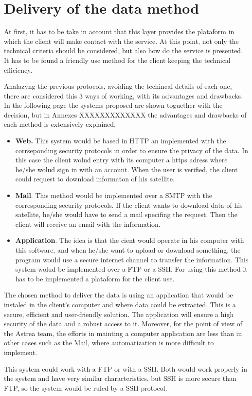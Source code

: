 \section{Delivery of the data method} 
At first, it has to be take in account that this layer provides the plataform in which the client will make contact with the service. At this point, not only the technical criteria should be considered, but also how do the service is presented. It has to be found a friendly use method for the client keeping the technical efficiency.

Analazyng the previous protocols, avoiding the techincal details of each one, there are considered this 3 ways of working, with its advantages and drawbacks. In the following page the systems proposed are shown toguether with the decision, but in Annexes XXXXXXXXXXXXX the advantages and drawbacks of each method is extensively explained.
\begin{itemize}
\item \textbf{Web.} This system would be based in HTTP an implemented with the corrseponding security protocols in order to ensure the privacy of the data. In this case the client wolud entry with its computer a https adress where he/she wolud sign in with an account. When the user is verified, the client could request to download informaton of his satellite. 
\item \textbf{Mail}. This method would be implemented over a SMTP with the corresponding security protocols. If the client wants to download data of his satellite, he/she would have to send a mail specifing the request. Then the client will receive an email with the information.
\item \textbf{Application}.  The idea is that the cient would operate in his computer with this software, and when he/she want to upload or download something, the program would use a secure internet channel to transfer the information. This system wolud be implemented over a FTP or a SSH. For using this method it has to be implemented a plataform for the client use.
\end{itemize}

The chosen method to deliver the data is using an application that would be instaled in the client's computer and where data could be extracted. This is a secure, efficient and user-friendly solution. The application will ensure a high security of the data and a robust access to it. Moreover, for the point of view of the Astrea team, the efforts in mainting a computer application are less than in other cases such as the Mail, where automatization is more difficult to implement.

This system could work with a FTP or with a SSH. Both would work properly in the system and have very similar characteristics, but SSH is more secure than FTP, so the system would be ruled by a SSH protocol.